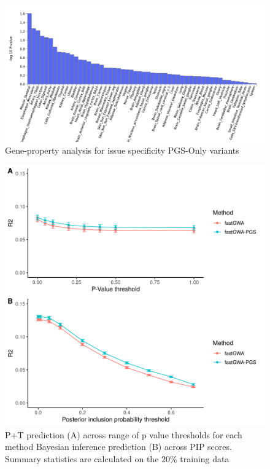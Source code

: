 \documentclass{article}
\begin{document}
\begin{figure}[h!]
  \includegraphics[width=\textwidth]{images/suppFig5.png}
  \caption{Gene-property analysis for issue specificity PGS-Only variants}
\end{figure}

\begin{figure}[h!]
  \includegraphics[width=\textwidth]{images/suppFig6.png}
  \caption{P+T prediction (A) across range of p value thresholds for each method Bayesian inference prediction (B) across PIP scores. Summary statistics are calculated on the 20\% training data}
\end{figure}
\end{document}
